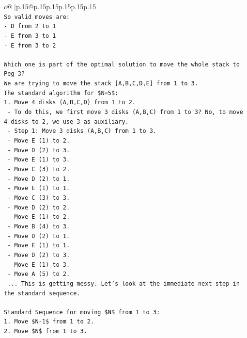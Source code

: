 \documentclass{article}
\begin{document}
{\begin{supertabular}{c@{$\;$}|p{.15\linewidth}@{}p{.15\linewidth}p{.15\linewidth}p{.15\linewidth}p{.15\linewidth}p{.15\linewidth}}
{{{\\ 
\texttt{So valid moves are:} \\
\texttt{{-} D from 2 to 1} \\
\texttt{{-} E from 3 to 1} \\
\texttt{{-} E from 3 to 2} \\
\\ 
\texttt{Which one is part of the optimal solution to move the whole stack to Peg 3?} \\
\texttt{We are trying to move the stack {[}A,B,C,D,E{]} from 1 to 3.} \\
\texttt{The standard algorithm for \$N=5\$:} \\
\texttt{1. Move 4 disks (A,B,C,D) from 1 to 2.} \\
\texttt{   {-} To do this, we first move 3 disks (A,B,C) from 1 to 3? No, to move 4 disks to 2, we use 3 as auxiliary.} \\
\texttt{   {-} Step 1: Move 3 disks (A,B,C) from 1 to 3.} \\
\texttt{     {-} Move E (1) to 2.} \\
\texttt{     {-} Move D (2) to 3.} \\
\texttt{     {-} Move E (1) to 3.} \\
\texttt{     {-} Move C (3) to 2.} \\
\texttt{     {-} Move D (2) to 1.} \\
\texttt{     {-} Move E (1) to 1.} \\
\texttt{     {-} Move C (3) to 3.} \\
\texttt{     {-} Move D (2) to 2.} \\
\texttt{     {-} Move E (1) to 2.} \\
\texttt{     {-} Move B (4) to 3.} \\
\texttt{     {-} Move D (2) to 1.} \\
\texttt{     {-} Move E (1) to 1.} \\
\texttt{     {-} Move D (2) to 3.} \\
\texttt{     {-} Move E (1) to 3.} \\
\texttt{     {-} Move A (5) to 2.} \\
\texttt{     ... This is getting messy. Let's look at the immediate next step in the standard sequence.} \\
\\ 
\texttt{Standard Sequence for moving \$N\$ from 1 to 3:} \\
\texttt{1. Move \$N{-}1\$ from 1 to 2.} \\
\texttt{2. Move \$N\$ from 1 to 3.} \\
}}}
\end{supertabular}}
\end{document}
